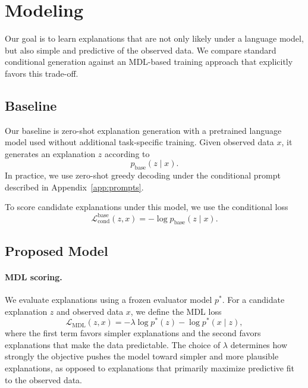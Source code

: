 \documentclass{article}
\theoremstyle{plain}
\theoremstyle{definition}
\theoremstyle{remark}
\begin{document}



\section{Modeling}
\label{sec:modeling}
Our goal is to learn explanations that are not only likely under a language model, but also simple and predictive of the observed data. We compare standard conditional generation against an MDL-based training approach that explicitly favors this trade-off.

\subsection{Baseline}

Our baseline is zero-shot explanation generation with a pretrained language model used without additional task-specific training. Given observed data $x$, it generates an explanation $z$ according to
\begin{equation}
p_{\text{base}}(z \mid x).
\end{equation}
In practice, we use zero-shot greedy decoding under the conditional prompt described in Appendix~\ref{app:prompts}.

To score candidate explanations under this model, we use the conditional loss
\begin{equation}
\mathcal{L}_{\text{cond}}^{\text{base}}(z,x)
=
-\log p_{\text{base}}(z \mid x).
\end{equation}


\subsection{Proposed Model}

\paragraph{MDL scoring.}
We evaluate explanations using a frozen evaluator model $p^*$. For a candidate explanation $z$ and observed data $x$, we define the MDL loss
\begin{equation}
\mathcal{L}_{\mathrm{MDL}}(z,x)
=
-\lambda \log p^*(z)
-
\log p^*(x \mid z),
\end{equation}
where the first term favors simpler explanations and the second favors explanations that make the data predictable.
The choice of $\lambda$ determines how strongly the objective pushes the model toward simpler and more plausible explanations, as opposed to explanations that primarily maximize predictive fit to the observed data.
\end{document}
